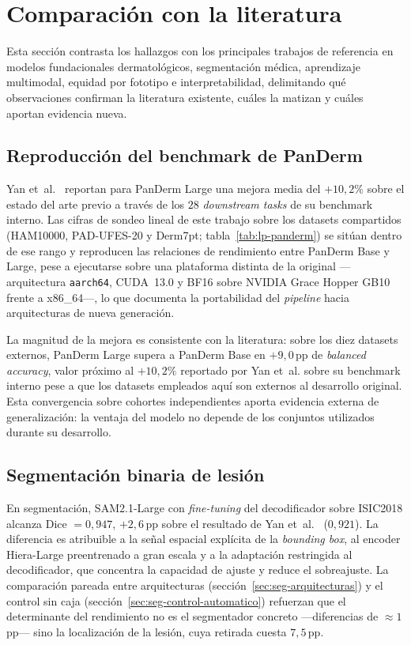 \section{Comparación con la literatura}
\label{sec:lit}

Esta sección contrasta los hallazgos con los principales trabajos de
referencia en modelos fundacionales dermatológicos, segmentación médica,
aprendizaje multimodal, equidad por fototipo e interpretabilidad,
delimitando qué observaciones confirman la literatura existente, cuáles
la matizan y cuáles aportan evidencia nueva.

\subsection{Reproducción del benchmark de PanDerm}
\label{sec:lit-panderm}

Yan et~al.~\cite{panderm2025} reportan para PanDerm Large una mejora
media del $+10{,}2\%$ sobre el estado del arte previo a través de los
$28$ \emph{downstream tasks} de su benchmark interno. Las cifras de
sondeo lineal de este trabajo sobre los datasets compartidos (HAM10000,
PAD-UFES-20 y Derm7pt; tabla~\ref{tab:lp-panderm}) se sitúan dentro de
ese rango y reproducen las relaciones de rendimiento entre PanDerm Base
y Large, pese a ejecutarse sobre una plataforma distinta de la original
---arquitectura \texttt{aarch64}, CUDA~13.0 y BF16 sobre NVIDIA Grace
Hopper GB10 frente a x86\_64---, lo que documenta la portabilidad del
\emph{pipeline} hacia arquitecturas de nueva generación.

La magnitud de la mejora es consistente con la literatura: sobre los
diez datasets externos, PanDerm Large supera a PanDerm Base en
$+9{,}0$\,pp de \emph{balanced accuracy}, valor próximo al $+10{,}2\%$
reportado por Yan et~al. sobre su benchmark interno pese a que los
datasets empleados aquí son externos al desarrollo original. Esta
convergencia sobre cohortes independientes aporta evidencia externa de
generalización: la ventaja del modelo no depende de los conjuntos
utilizados durante su desarrollo.

\subsection{Segmentación binaria de lesión}
\label{sec:lit-seg}

En segmentación, SAM2.1-Large con \emph{fine-tuning} del decodificador
sobre ISIC2018 alcanza Dice $= 0{,}947$, $+2{,}6$\,pp sobre el resultado
de Yan et~al.~\cite{panderm2025} ($0{,}921$). La diferencia es atribuible
a la señal espacial explícita de la \emph{bounding box}, al encoder
Hiera-Large preentrenado a gran escala y a la adaptación restringida al
decodificador, que concentra la capacidad de ajuste y reduce el
sobreajuste. La comparación pareada entre arquitecturas
(sección~\ref{sec:seg-arquitecturas}) y el control sin caja
(sección~\ref{sec:seg-control-automatico}) refuerzan que el determinante
del rendimiento no es el segmentador concreto ---diferencias de
$\approx 1$\,pp--- sino la localización de la lesión, cuya retirada cuesta
$7{,}5$\,pp.

